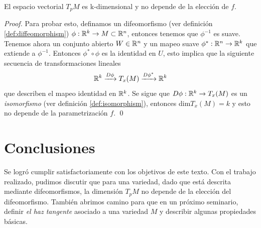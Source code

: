 \begin{proposition}
    El espacio vectorial $T_{p}M$ es k-dimensional y no depende de la elecci\'on de $f$.
\end{proposition}
\begin{proof}
    Para probar esto, definamos un difeomorfismo (ver definici\'on \ref{def:diffeomorphism}) $\phi: \mathbb{R}^{k} \rightarrow M \subset \mathbb{R}^{n}$,
    entonces tenemos que $\phi^{-1}$ es suave. Tenemos ahora un conjunto abierto $W \in \mathbb{R}^{n}$ y
    un mapeo suave $\phi^{*}:\mathbb{R}^{n} \rightarrow \mathbb{R}^{k}$ que extiende a $\phi^{-1}$. Entonces $\phi^{*} \circ \phi$ es la
    identidad en $U$, esto implica que la siguiente secuencia de transformaciones lineales
    $$\mathbb{R}^{k} \xrightarrow{D\phi} T_{x}(M) \xrightarrow{D\phi^{*}} \mathbb{R}^{k} $$
    que describen el mapeo identidad en $\mathbb{R}^{k}$. Se sigue que $D\phi:\mathbb{R}^{k} \rightarrow T_{x}(M)$
    es un \emph{isomorfismo} (ver definici\'on \ref{def:isomorphism}), entonces dim$T_{x}(M)=k$ y
    esto no depende de la parametrizaci\'on $f$. \qed
\end{proof}

\section{Conclusiones}

Se logró cumplir satisfactoriamente con los objetivos de este texto. Con el trabajo realizado, pudimos 
discutir que para una variedad, dado que está descrita mediante difeomorfismos, la dimensi\'on $T_{p}M$ no depende de la 
elección del difeomorfismo. Tambi\'en abrimos camino para que en un pr\'oximo seminario, definir \emph{el haz tangente}
asociado a una variedad $M$ y describir algunas propiedades b\'asicas.

